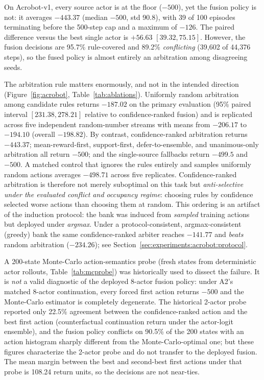 \documentclass[11pt]{article}
\begin{document}
On Acrobot-v1, every source actor is at the floor ($-500$), yet the fusion policy is not: it
averages $-443.37$ (median $-500$, std 90.8), with 39 of 100 episodes terminating before the
500-step cap and a maximum of $-126$. The paired difference versus the best single actor is $+56.63$
$[39.32,75.15]$. However, the fusion decisions are 95.7\% rule-covered and 89.2\% \emph{conflicting}
(39{,}602 of 44{,}376 steps), so the fused policy is almost entirely an arbitration among
disagreeing seeds.

The arbitration rule matters enormously, and not in the intended direction
(Figure~\ref{fig:acrobot}, Table~\ref{tab:ablations}). Uniformly random arbitration among candidate
rules returns $-187.02$ on the primary evaluation (95\% paired interval $[231.38,278.21]$ relative
to confidence-ranked fusion) and is replicated across five independent random-number streams with
means from $-206.17$ to $-194.10$ (overall $-198.82$). By contrast, confidence-ranked arbitration
returns $-443.37$; mean-reward-first, support-first, defer-to-ensemble, and unanimous-only
arbitration all return $-500$; and the single-source fallbacks return $-499.5$ and $-500$. A matched
control that ignores the rules entirely and samples uniformly random actions averages $-498.71$
across five replicates. Confidence-ranked arbitration is therefore not merely suboptimal on this task
but \emph{anti-selective under the evaluated conflict and occupancy regime}: choosing rules by
confidence selected worse actions than choosing them at random. This ordering is an artifact of the
induction protocol: the bank was induced from \emph{sampled} training actions but deployed under
\emph{argmax}. Under a protocol-consistent, argmax-consistent (greedy) bank the same confidence-ranked
arbiter reaches $-141.77$ and \emph{beats} random arbitration ($-234.26$); see
Section~\ref{sec:experiments:acrobot:protocol}.

A 200-state Monte-Carlo action-semantics probe (fresh states from deterministic actor rollouts,
Table~\ref{tab:mcprobe}) was historically used to dissect the failure. It is \emph{not} a valid
diagnostic of the deployed 8-actor fusion policy: under A2's matched 8-actor continuation, every
forced first action returns $-500$ and the Monte-Carlo estimator is completely degenerate. The
historical 2-actor probe reported only 22.5\% agreement between the confidence-ranked action and the
best first action (counterfactual continuation return under the actor-logit ensemble), and the fusion
policy conflicts on 90.5\% of the 200 states with an action histogram sharply different from the
Monte-Carlo-optimal one; but these figures characterize the 2-actor probe and do not transfer to the
deployed fusion. The mean margin between the best and second-best first actions under that probe is
108.24 return units, so the decisions are not near-ties.
\end{document}
